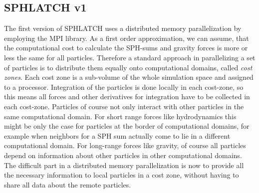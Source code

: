 \subsection{SPHLATCH v1}
The first version of SPHLATCH uses a distributed memory parallelization by employing the MPI library. As a first order approximation, we can assume, that the computational cost to calculate the SPH-sums and gravity forces is more or less the same for all particles. Therefore a standard approach in parallelizing a set of particles is to distribute them equally onto computational domains, called \emph{cost zones}. Each cost zone is a sub-volume of the whole simulation space and assigned to a processor. Integration of the particles is done locally in each cost-zone, so this means all forces and other derivatives for integration have to be collected in each cost-zone. Particles of course not only interact with other particles in the same computational domain. For short range forces like hydrodynamics this might be only the case for particles at the border of computational domains, for example when neighbors for a SPH sum actually come to lie in a different computational domain. For long-range forces like gravity, of course all particles depend on information about other particles in other computational domains. The difficult part in a distributed memory parallelization is now to provide all the necessary information to local particles in a cost zone, without having to share all data about the remote particles. 

